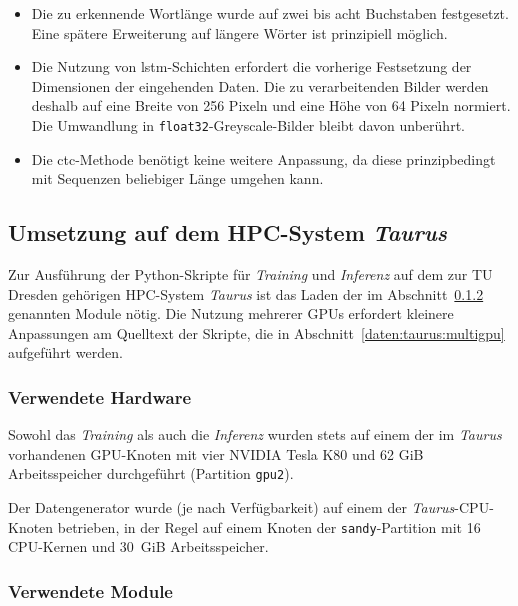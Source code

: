 \begin{itemize}
    \item Die zu erkennende Wortlänge wurde auf zwei bis acht Buchstaben festgesetzt. Eine spätere Erweiterung auf
          längere Wörter ist prinzipiell möglich.
    \item Die Nutzung von \gls{lstm}-Schichten erfordert die vorherige Festsetzung der Dimensionen der eingehenden
          Daten. Die zu verarbeitenden Bilder werden deshalb auf eine Breite von 256 Pixeln und eine Höhe von 64 Pixeln
          normiert. Die Umwandlung in \texttt{float32}-Greyscale-Bilder bleibt davon unberührt.
    \item Die \gls{ctc}-Methode benötigt keine weitere Anpassung, da diese prinzipbedingt mit Sequenzen beliebiger
          Länge umgehen kann.
\end{itemize}

\subsection{Umsetzung auf dem HPC-System \textit{Taurus}}
\label{daten:taurus}

Zur Ausführung der Python-Skripte für \textit{Training} und \textit{Inferenz} auf dem zur TU Dresden gehörigen
HPC-System \textit{Taurus} ist das Laden der im Abschnitt~\ref{daten:taurus:module} genannten Module nötig. Die Nutzung
mehrerer GPUs erfordert kleinere Anpassungen am Quelltext der Skripte, die in Abschnitt~\ref{daten:taurus:multigpu}
aufgeführt werden.

\subsubsection{Verwendete Hardware}
\label{daten:taurus:hardware}

Sowohl das \textit{Training} als auch die \textit{Inferenz} wurden stets auf einem der im \textit{Taurus} vorhandenen
GPU-Knoten mit vier NVIDIA Tesla K80 und 62 GiB Arbeitsspeicher durchgeführt (Partition \texttt{gpu2}).

Der Datengenerator wurde (je nach Verfügbarkeit) auf einem der \textit{Taurus}-CPU-Knoten betrieben, in der Regel auf
einem Knoten der \texttt{sandy}-Partition mit 16 CPU-Kernen und 30\ GiB Arbeitsspeicher.

\subsubsection{Verwendete Module}
\label{daten:taurus:module}

